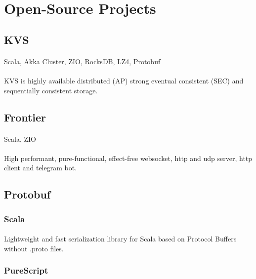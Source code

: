 \pagebreak

\section{Open-Source Projects}

\subsection{KVS}
\paragraph{} Scala, Akka Cluster, ZIO, RocksDB, LZ4, Protobuf
\paragraph{}
KVS is highly available distributed (AP) strong eventual consistent (SEC) and sequentially consistent storage.

\subsection{Frontier}
\paragraph{} Scala, ZIO
\paragraph{}
High performant, pure-functional, effect-free websocket, http and udp server, http client and telegram bot.

\subsection{Protobuf}
\subsubsection{Scala}
\paragraph{}
Lightweight and fast serialization library for Scala based on Protocol Buffers without .proto files.

\subsubsection{PureScript}

